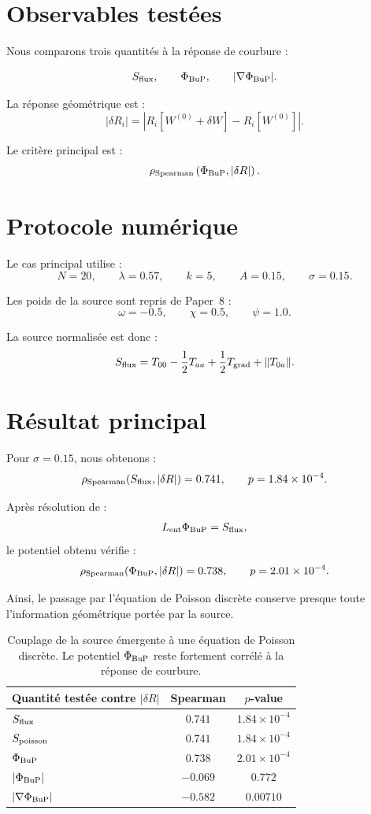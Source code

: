 \documentclass[11pt,a4paper]{article}
\begin{document}
\section{Observables testées}

Nous comparons trois quantités à la réponse de courbure :

\[
S_{\rm flux},
\qquad
\Phi_{\rm BuP},
\qquad
|\nabla\Phi_{\rm BuP}|.
\]

La réponse géométrique est :
\[
|\delta R_i|
=
|R_i[W^{(0)}+\delta W]-R_i[W^{(0)}]|.
\]

Le critère principal est :
\[
\rho_{\rm Spearman}
\left(
\Phi_{\rm BuP},
|\delta R|
\right).
\]

\section{Protocole numérique}

Le cas principal utilise :
\[
N=20,
\qquad
\lambda=0.57,
\qquad
k=5,
\qquad
A=0.15,
\qquad
\sigma=0.15.
\]

Les poids de la source sont repris de Paper~8 :
\[
\omega=-0.5,
\qquad
\chi=0.5,
\qquad
\psi=1.0.
\]

La source normalisée est donc :
\[
S_{\rm flux}
=
T_{00}
-\frac12T_{aa}
+
\frac12T_{\rm grad}
+
\|T_{0a}\|.
\]

\section{Résultat principal}

Pour \(\sigma=0.15\), nous obtenons :
\[
\rho_{\rm Spearman}(S_{\rm flux},|\delta R|)
=
0.741,
\qquad
p=1.84\times10^{-4}.
\]

Après résolution de :
\[
L_{\rm ent}\Phi_{\rm BuP}
=
S_{\rm flux},
\]
le potentiel obtenu vérifie :
\[
\rho_{\rm Spearman}(\Phi_{\rm BuP},|\delta R|)
=
0.738,
\qquad
p=2.01\times10^{-4}.
\]

Ainsi, le passage par l'équation de Poisson discrète conserve presque toute
l'information géométrique portée par la source.

\begin{table}[htbp]
\centering
\begin{tabular}{l c c}
\toprule
Quantité testée contre \(|\delta R|\) & Spearman & \(p\)-value \\
\midrule
\(S_{\rm flux}\) & \(0.741\) & \(1.84\times10^{-4}\) \\
\(S_{\rm poisson}\) & \(0.741\) & \(1.84\times10^{-4}\) \\
\(\Phi_{\rm BuP}\) & \(0.738\) & \(2.01\times10^{-4}\) \\
\(|\Phi_{\rm BuP}|\) & \(-0.069\) & \(0.772\) \\
\(|\nabla\Phi_{\rm BuP}|\) & \(-0.582\) & \(0.00710\) \\
\bottomrule
\end{tabular}
\caption{
Couplage de la source émergente à une équation de Poisson discrète. Le potentiel
\(\Phi_{\rm BuP}\) reste fortement corrélé à la réponse de courbure.
}
\end{table}
\end{document}
